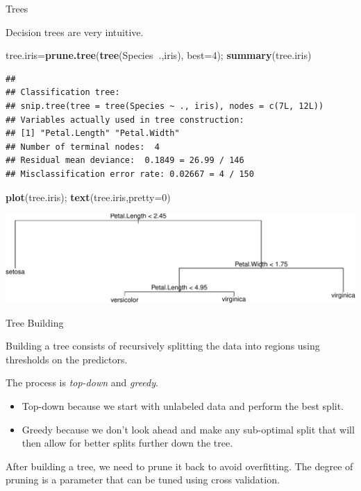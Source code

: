 \documentclass[
  ignorenonframetext,
]{beamer}
\newenvironment{Shaded}{\begin{snugshade}}{\end{snugshade}}
\newcommand{\DataTypeTok}[1]{\textcolor[rgb]{0.13,0.29,0.53}{#1}}
\newcommand{\DecValTok}[1]{\textcolor[rgb]{0.00,0.00,0.81}{#1}}
\newcommand{\KeywordTok}[1]{\textcolor[rgb]{0.13,0.29,0.53}{\textbf{#1}}}
\newcommand{\NormalTok}[1]{#1}
\newcommand{\OperatorTok}[1]{\textcolor[rgb]{0.81,0.36,0.00}{\textbf{#1}}}
\providecommand{\tightlist}{%
  \setlength{\itemsep}{0pt}\setlength{\parskip}{0pt}}
\begin{document}
\begin{frame}[fragile]{Trees}
\protect\hypertarget{trees}{}

Decision trees are very intuitive.

\scriptsize

\begin{Shaded}
\begin{Highlighting}[]
\NormalTok{tree.iris=}\KeywordTok{prune.tree}\NormalTok{(}\KeywordTok{tree}\NormalTok{(Species}\OperatorTok{~}\NormalTok{.,iris), }\DataTypeTok{best=}\DecValTok{4}\NormalTok{); }\KeywordTok{summary}\NormalTok{(tree.iris)}
\end{Highlighting}
\end{Shaded}

\begin{verbatim}
## 
## Classification tree:
## snip.tree(tree = tree(Species ~ ., iris), nodes = c(7L, 12L))
## Variables actually used in tree construction:
## [1] "Petal.Length" "Petal.Width" 
## Number of terminal nodes:  4 
## Residual mean deviance:  0.1849 = 26.99 / 146 
## Misclassification error rate: 0.02667 = 4 / 150
\end{verbatim}

\begin{Shaded}
\begin{Highlighting}[]
\KeywordTok{plot}\NormalTok{(tree.iris); }\KeywordTok{text}\NormalTok{(tree.iris,}\DataTypeTok{pretty=}\DecValTok{0}\NormalTok{)}
\end{Highlighting}
\end{Shaded}

\includegraphics{classify_files/figure-beamer/unnamed-chunk-10-1.pdf}

\end{frame}

\begin{frame}{Tree Building}
\protect\hypertarget{tree-building}{}

Building a tree consists of recursively splitting the data into regions
using thresholds on the predictors.

The process is \emph{top-down} and \emph{greedy}.

\begin{itemize}
\tightlist
\item
  Top-down because we start with unlabeled data and perform the best
  split.
\item
  Greedy because we don't look ahead and make any sub-optimal split that
  will then allow for better splits further down the tree.
\end{itemize}

After building a tree, we need to prune it back to avoid overfitting.
The degree of pruning is a parameter that can be tuned using cross
validation.

\end{frame}
\end{document}
